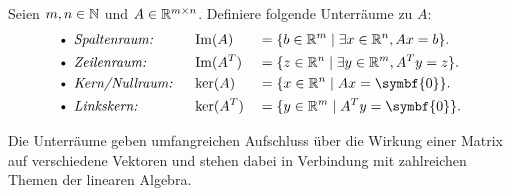 \begin{definition}\label{df:four}
    Seien \(m,n \in \mathbb{N}\) und \(A \in \mathbb{R}^{m \times n}\). Definiere folgende Unterräume zu \(A\): 
    \begin{alignat*}{3}
        \text{\textbullet } &\textit{ Spaltenraum: } 
        &&\Img(A) &{}={}& \{ b \in \R^m \mid \exists x \in \R^n, Ax = b \}. \\
        \text{\textbullet } &\textit{ Zeilenraum: }
        &&\Img(A^{T}) &{}={}& \{ z \in \R^n \mid \exists y \in \R^m, A^{T}y = z \}.\\
        \text{\textbullet } &\textit{ Kern/Nullraum: }
        &&\ker(A) &{}={}& \{ x \in \R^n \mid Ax = \symbf{0} \}.\\
        \text{\textbullet } &\textit{ Linkskern: }
        &&\ker(A^{T}) &{}={}& \{ y \in \R^m \mid A^{T}y = \symbf{0} \}.
    \end{alignat*}
\end{definition}
Die Unterräume geben umfangreichen Aufschluss über die Wirkung einer Matrix auf verschiedene Vektoren und stehen dabei in Verbindung mit zahlreichen Themen der linearen Algebra.

